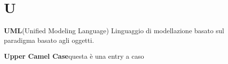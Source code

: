 \newpage
\section{U}\label{l:U}
\textbf{UML}\newline (Unified Modeling Language) Linguaggio di modellazione basato sul paradigma basato agli oggetti.

\textbf{Upper Camel Case}\newline questa è una entry a caso